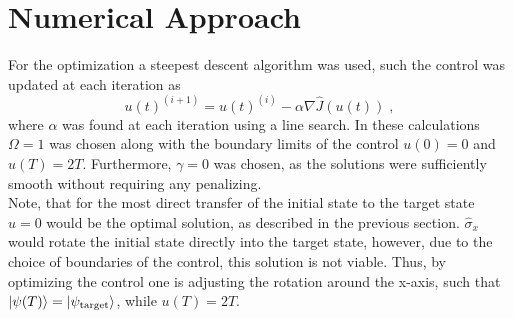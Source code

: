 

\section{Numerical Approach}
For the optimization a steepest descent algorithm was used, such the control was updated at each iteration as
\begin{equation}
	u(t)^{(i+1)} = u(t)^{(i)} - \alpha \nabla \hat{J}(u(t)) \; ,
\end{equation}
where $\alpha$ was found at each iteration using a line search.
In these calculations $\Omega = 1$ was chosen along with the boundary limits of the control $u(0) = 0$ and $u(T) = 2 T$. Furthermore, $\gamma = 0$ was chosen, as the solutions were sufficiently smooth without requiring any penalizing.\\
Note, that for the most direct transfer of the initial state to the target state $u = 0$ would be the optimal solution, as described in the previous section. $\hat{\sigma}_x$ would rotate the initial state directly into the target state, however, due to the choice of boundaries of the control, this solution is not viable. Thus, by optimizing the control one is adjusting the rotation around the x-axis, such that $\ket{\psi (T)} = \ket{\psi _{\mathrm{target}}}$, while $u(T) = 2 T$.

